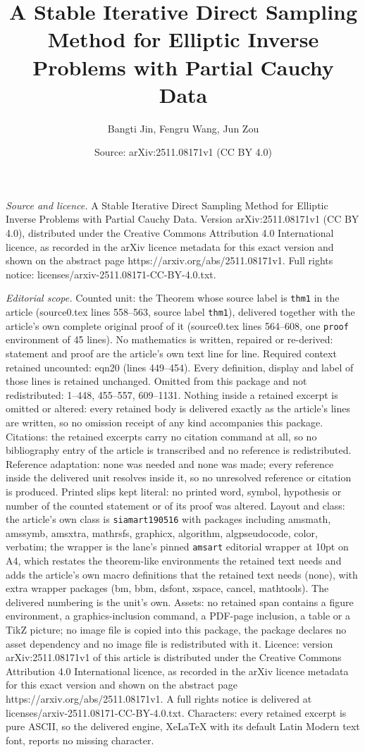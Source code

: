 \documentclass[10pt,a4paper]{amsart}
\title[A Stable Iterative Direct Sampling Method for Elliptic Inver]{A Stable Iterative Direct Sampling Method for Elliptic Inverse Problems with Partial Cauchy Data}
\author{Bangti Jin, Fengru Wang, Jun Zou}
\date{Source: arXiv:2511.08171v1 (CC BY 4.0)}
\begin{document}
\maketitle

\noindent\emph{Source and licence.} A Stable Iterative Direct Sampling Method for Elliptic Inverse Problems with Partial Cauchy Data. Version arXiv:2511.08171v1 (CC BY 4.0), distributed under the Creative Commons Attribution 4.0 International licence, as recorded in the arXiv licence metadata for this exact version and shown on the abstract page https://arxiv.org/abs/2511.08171v1. Full rights notice: licenses/arxiv-2511.08171-CC-BY-4.0.txt.\par\smallskip

\noindent\textit{Editorial scope.} Counted unit: the Theorem whose source label is \texttt{thm1} in the article (source0.tex lines 558--563, source label \texttt{thm1}), delivered together with the article's own complete original proof of it (source0.tex lines 564--608, one \texttt{proof} environment of 45 lines). No mathematics is written, repaired or re-derived: statement and proof are the article's own text line for line. Required context retained uncounted: eqn20 (lines 449--454). Every definition, display and label of those lines is retained unchanged. Omitted from this package and not redistributed: 1--448, 455--557, 609--1131. Nothing inside a retained excerpt is omitted or altered: every retained body is delivered exactly as the article's lines are written, so no omission receipt of any kind accompanies this package. Citations: the retained excerpts carry no citation command at all, so no bibliography entry of the article is transcribed and no reference is redistributed. Reference adaptation: none was needed and none was made; every reference inside the delivered unit resolves inside it, so no unresolved reference or citation is produced. Printed slips kept literal: no printed word, symbol, hypothesis or number of the counted statement or of its proof was altered. Layout and class: the article's own class is \texttt{siamart190516} with packages including amsmath, amssymb, amsxtra, mathrsfs, graphicx, algorithm, algpseudocode, color, verbatim; the wrapper is the lane's pinned \texttt{amsart} editorial wrapper at 10pt on A4, which restates the theorem-like environments the retained text needs and adds the article's own macro definitions that the retained text needs (none), with extra wrapper packages (bm, bbm, dsfont, xspace, cancel, mathtools). The delivered numbering is the unit's own. Assets: no retained span contains a figure environment, a graphics-inclusion command, a PDF-page inclusion, a table or a TikZ picture; no image file is copied into this package, the package declares no asset dependency and no image file is redistributed with it. Licence: version arXiv:2511.08171v1 of this article is distributed under the Creative Commons Attribution 4.0 International licence, as recorded in the arXiv licence metadata for this exact version and shown on the abstract page https://arxiv.org/abs/2511.08171v1. A full rights notice is delivered at licenses/arxiv-2511.08171-CC-BY-4.0.txt. Characters: every retained excerpt is pure ASCII, so the delivered engine, XeLaTeX with its default Latin Modern text font, reports no missing character.
\end{document}
